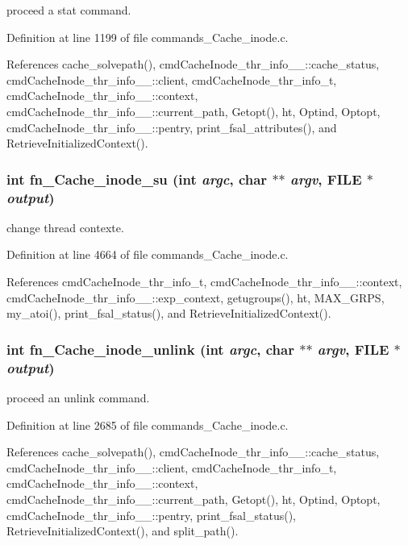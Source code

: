 proceed a stat command. 

Definition at line 1199 of file commands\_\-Cache\_\-inode.c.

References cache\_\-solvepath(), cmd\-Cache\-Inode\_\-thr\_\-info\_\-\_\-::cache\_\-status, cmd\-Cache\-Inode\_\-thr\_\-info\_\-\_\-::client, cmd\-Cache\-Inode\_\-thr\_\-info\_\-t, cmd\-Cache\-Inode\_\-thr\_\-info\_\-\_\-::context, cmd\-Cache\-Inode\_\-thr\_\-info\_\-\_\-::current\_\-path, Getopt(), ht, Optind, Optopt, cmd\-Cache\-Inode\_\-thr\_\-info\_\-\_\-::pentry, print\_\-fsal\_\-attributes(), and Retrieve\-Initialized\-Context().
\subsubsection{\setlength{\rightskip}{0pt plus 5cm}int fn\_\-Cache\_\-inode\_\-su (int {\em argc}, char $\ast$$\ast$ {\em argv}, FILE $\ast$ {\em output})}\label{commands_8h_a57}


change thread contexte. 

Definition at line 4664 of file commands\_\-Cache\_\-inode.c.

References cmd\-Cache\-Inode\_\-thr\_\-info\_\-t, cmd\-Cache\-Inode\_\-thr\_\-info\_\-\_\-::context, cmd\-Cache\-Inode\_\-thr\_\-info\_\-\_\-::exp\_\-context, getugroups(), ht, MAX\_\-GRPS, my\_\-atoi(), print\_\-fsal\_\-status(), and Retrieve\-Initialized\-Context().
\subsubsection{\setlength{\rightskip}{0pt plus 5cm}int fn\_\-Cache\_\-inode\_\-unlink (int {\em argc}, char $\ast$$\ast$ {\em argv}, FILE $\ast$ {\em output})}\label{commands_8h_a48}


proceed an unlink command. 

Definition at line 2685 of file commands\_\-Cache\_\-inode.c.

References cache\_\-solvepath(), cmd\-Cache\-Inode\_\-thr\_\-info\_\-\_\-::cache\_\-status, cmd\-Cache\-Inode\_\-thr\_\-info\_\-\_\-::client, cmd\-Cache\-Inode\_\-thr\_\-info\_\-t, cmd\-Cache\-Inode\_\-thr\_\-info\_\-\_\-::context, cmd\-Cache\-Inode\_\-thr\_\-info\_\-\_\-::current\_\-path, Getopt(), ht, Optind, Optopt, cmd\-Cache\-Inode\_\-thr\_\-info\_\-\_\-::pentry, print\_\-fsal\_\-status(), Retrieve\-Initialized\-Context(), and split\_\-path().
